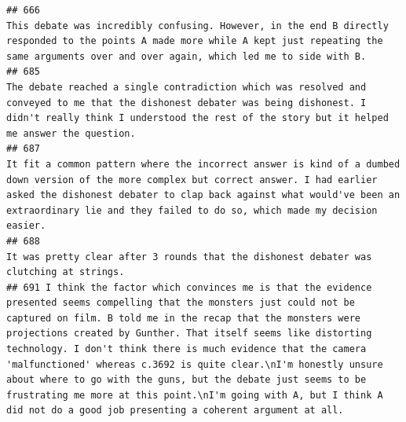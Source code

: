 \documentclass[
]{article}
\begin{document}
\begin{verbatim}
## 666                                                                                                                                                                                                                                                                                                                                                                                          This debate was incredibly confusing. However, in the end B directly responded to the points A made more while A kept just repeating the same arguments over and over again, which led me to side with B.
## 685                                                                                                                                                                                                                                                                                                                                                                    The debate reached a single contradiction which was resolved and conveyed to me that the dishonest debater was being dishonest. I didn't really think I understood the rest of the story but it helped me answer the question. 
## 687                                                                                                                                                                                                                                                                                                       It fit a common pattern where the incorrect answer is kind of a dumbed down version of the more complex but correct answer. I had earlier asked the dishonest debater to clap back against what would've been an extraordinary lie and they failed to do so, which made my decision easier. 
## 688                                                                                                                                                                                                                                                                                                                                                                                                                                                                                                           It was pretty clear after 3 rounds that the dishonest debater was clutching at strings. 
## 691 I think the factor which convinces me is that the evidence presented seems compelling that the monsters just could not be captured on film. B told me in the recap that the monsters were projections created by Gunther. That itself seems like distorting technology. I don't think there is much evidence that the camera 'malfunctioned' whereas c.3692 is quite clear.\nI'm honestly unsure about where to go with the guns, but the debate just seems to be frustrating me more at this point.\nI'm going with A, but I think A did not do a good job presenting a coherent argument at all.

\end{verbatim}
\end{document}
